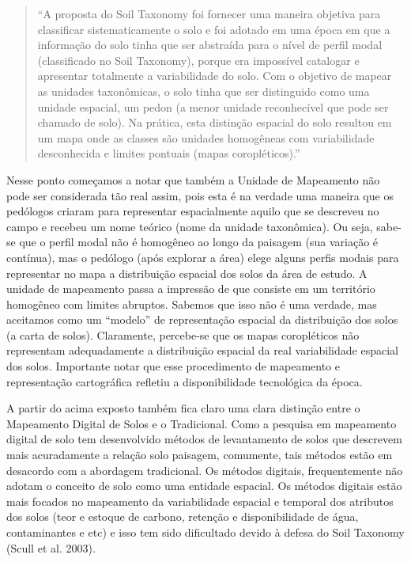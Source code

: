 \begin{quotation}
  ``A proposta do Soil Taxonomy foi fornecer uma maneira objetiva para classificar sistematicamente o solo e foi adotado em uma época em que a informação do solo tinha que ser abstraída para o nível de perfil modal (classificado no Soil Taxonomy), porque era impossível catalogar e apresentar totalmente a variabilidade do solo. Com o objetivo de mapear as unidades taxonômicas, o solo tinha que ser distinguido como uma unidade espacial, um pedon (a menor unidade reconhecível que pode ser chamado de solo). Na prática, esta distinção espacial do solo resultou em um mapa onde as classes são unidades homogêneas com variabilidade desconhecida e limites pontuais (mapas coropléticos).''
\end{quotation}

Nesse ponto começamos a notar que também a Unidade de Mapeamento não pode ser considerada tão real assim, pois esta é na verdade uma maneira que os pedólogos criaram para representar espacialmente aquilo que se descreveu no campo e recebeu um nome teórico (nome da unidade taxonômica). Ou seja, sabe-se que o perfil modal não é homogêneo ao longo da paisagem (sua variação é contínua), mas o pedólogo (após explorar a área) elege alguns perfis modais para representar no mapa a distribuição espacial dos solos da área de estudo. A unidade de mapeamento passa a impressão de que consiste em um território homogêneo com limites abruptos. Sabemos que isso não é uma verdade, mas aceitamos como um ``modelo'' de representação espacial da distribuição dos solos (a carta de solos). Claramente, percebe-se que os mapas coropléticos não representam adequadamente a distribuição espacial da real variabilidade espacial dos solos. Importante notar que esse procedimento de mapeamento e representação cartográfica refletiu a disponibilidade tecnológica da época.

A partir do acima exposto também fica claro uma clara distinção entre o Mapeamento Digital de Solos e o Tradicional. Como a pesquisa em mapeamento digital de solo tem desenvolvido métodos de levantamento de solos que descrevem mais acuradamente a relação solo paisagem, comumente, tais métodos estão em desacordo com a abordagem tradicional. Os métodos digitais, frequentemente não adotam o conceito de solo como uma entidade espacial. Os métodos digitais estão mais focados no mapeamento da variabilidade espacial e temporal dos atributos dos solos (teor e estoque de carbono, retenção e disponibilidade de água, contaminantes e etc) e isso tem sido dificultado devido à defesa do Soil Taxonomy (Scull et al. 2003).

